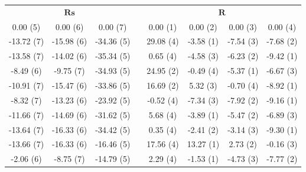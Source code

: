 \documentclass[11pt,a4paper,openright,twoside]{article}
\begin{document}
\begin{table}[h!]
\centering
\begin{tabular}{cccccccc}
\multicolumn{3}{c}{$\mathbf{Rs}$} & & \multicolumn{4}{c}{$\mathbf{R}$}\\
\cline{1-3} \cline{5-8}
0.00 (5) & 0.00 (6) & 0.00 (7) &  & 0.00 (1) & 0.00 (2) & 0.00 (3) & 0.00 (4)\\
-13.72 (7) & -15.98 (6) & -34.36 (5) & & 29.08 (4) & -3.58 (1) & -7.54 (3) & -7.68 (2)\\
-13.58 (7) & -14.02 (6) & -35.34 (5) & & 0.65 (4) & -4.58 (3) & -6.23 (2) & -9.42 (1)\\
-8.49 (6) & -9.75 (7) & -34.93 (5) & & 24.95 (2) & -0.49 (4) & -5.37 (1) & -6.67 (3) \\
-10.91 (7) & -15.47 (6) & -33.86 (5) & & 16.69 (2) & 5.32 (3) & -0.70 (4) & -8.92 (1)\\
-8.32 (7) & -13.23 (6) & -23.92 (5) & & -0.52 (4) & -7.34 (3) & -7.92 (2) & -9.16 (1)\\
-11.66 (7) & -14.69 (6) & -31.62 (5) & & 5.68 (4) & -3.89 (1) & -5.47 (2) & -6.89 (3)\\
-13.64 (7) & -16.33 (6) & -34.42 (5) & & 0.35 (4) & -2.41 (2) & -3.14 (3) & -9.30 (1)\\
-13.66 (7) & -16.33 (6) & -16.46 (5) & & 17.56 (4) & 13.27 (1) & 2.73 (2) & -0.16 (3)\\
-2.06 (6) & -8.75 (7) & -14.79 (5) & & 2.29 (4) & -1.53 (1) & -4.73 (3) & -7.77 (2)
\end{tabular}
\end{table}
\end{document}
